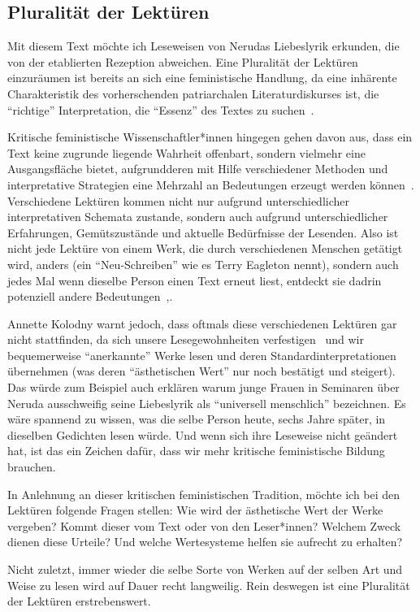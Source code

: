 \subsection{Pluralität der Lektüren}

Mit diesem Text möchte ich Leseweisen von Nerudas Liebeslyrik erkunden, die von der etablierten Rezeption abweichen.
Eine Pluralität der Lektüren einzuräumen ist bereits an sich eine feministische Handlung,
da eine inhärente Charakteristik des vorherschenden patriarchalen Literaturdiskurses ist, die ``richtige'' Interpretation, die ``Essenz'' des Textes zu suchen~\cite{Kolodny1980}.

Kritische feministische Wissenschaftler*innen hingegen gehen davon aus, dass ein Text keine zugrunde liegende Wahrheit offenbart, sondern vielmehr eine Ausgangsfläche bietet, aufgrundderen mit Hilfe verschiedener Methoden und interpretative Strategien eine Mehrzahl an Bedeutungen erzeugt werden können~\cite{Beehler1988}.
Verschiedene Lektüren kommen nicht nur aufgrund unterschiedlicher interpretativen Schemata zustande, sondern auch aufgrund unterschiedlicher Erfahrungen, Gemütszustände und aktuelle Bedürfnisse der Lesenden.
Also ist nicht jede Lektüre von einem Werk, die durch verschiedenen Menschen getätigt wird, anders (ein ``Neu-Schreiben'' wie es Terry Eagleton nennt), sondern auch jedes Mal wenn dieselbe Person einen Text erneut liest, entdeckt sie dadrin potenziell andere Bedeutungen~\cite{Eagleton1997},\cite{Kolodny1980}.

Annette Kolodny warnt jedoch, dass oftmals diese verschiedenen Lektüren gar nicht stattfinden, da sich unsere Lesegewohnheiten verfestigen~\cite{Kolodny1980} und wir bequemerweise ``anerkannte'' Werke lesen und deren Standardinterpretationen übernehmen (was deren ``ästhetischen Wert'' nur noch bestätigt und steigert).
Das würde zum Beispiel auch erklären warum junge Frauen in Seminaren über Neruda ausschweifig seine Liebeslyrik als ``universell menschlich'' bezeichnen.
Es wäre spannend zu wissen, was die selbe Person heute, sechs Jahre später, in dieselben Gedichten lesen würde.
Und wenn sich ihre Leseweise nicht geändert hat, ist das ein Zeichen dafür, dass wir mehr kritische feministische Bildung brauchen.

In Anlehnung an dieser kritischen feministischen Tradition, möchte ich bei den Lektüren folgende Fragen stellen: Wie wird der ästhetische Wert der Werke vergeben? Kommt dieser vom Text oder von den Leser*innen? 
Welchem Zweck dienen diese Urteile?
Und welche Wertesysteme helfen sie aufrecht zu erhalten?

Nicht zuletzt, immer wieder die selbe Sorte von Werken auf der selben Art und Weise zu lesen wird auf Dauer recht langweilig. %
Rein deswegen ist eine Pluralität der Lektüren erstrebenswert.
